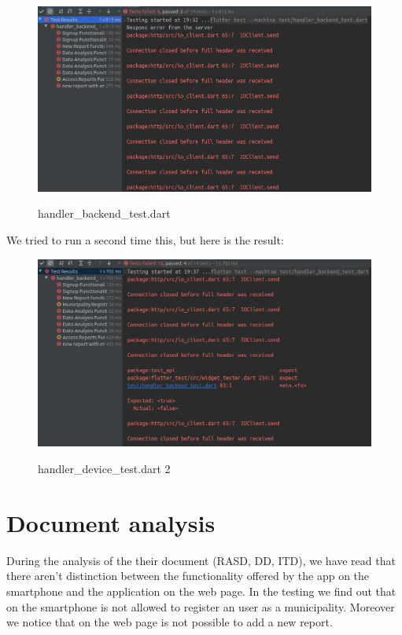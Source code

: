 \documentclass[../ATD.tex]{subfiles}
\begin{document}
    \begin{figure}[H]
        \centering
        \includegraphics[scale = 0.5]{assets/t7.png}\\
        \caption[handler\_device\_test.dart]{handler\_backend\_test.dart}
    \end{figure}
    We tried to run a second time this, but here is the result:
    \begin{figure}[H]
        \centering
        \includegraphics[scale = 0.5]{assets/t7v2.png}\\
        \caption[handler\_device\_test.dart 2]{handler\_device\_test.dart 2}
    \end{figure}


    \section{Document analysis}\label{sec:document-analysis}
    During the analysis of the their document (RASD, DD, ITD), we have read that there aren't distinction between the functionality offered by the app on the smartphone and the application on the web page.
    In the testing we find out that on the smartphone is not allowed to register an user as a municipality.
    Moreover we notice that on the web page is not possible to add a new report.
\end{document}
